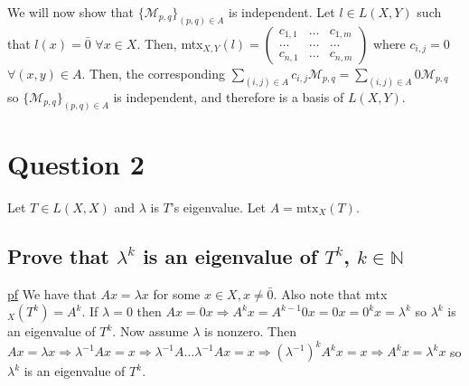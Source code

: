 \documentclass[11pt]{article} %
\begin{document}
We will now show that $\{ \mathcal{M}_{p,q} \}_{(p,q) \in A}$ is independent. Let $l \in L(X,Y)$ such that $l(x) = \bar{0}$ $\forall x \in X.$ Then, mtx$_{X,Y}(l) = \begin{pmatrix}c_{1,1} & \dots  & c_{1,m} \\ \dots & \dots & \dots \\ c_{n,1} & \dots  & c_{n,m} \end{pmatrix}$ where $c_{i,j} = 0$ $\forall (x,y) \in A.$ Then, the corresponding $\sum_{(i,j) \in A} c_{i,j}\mathcal{M}_{p,q} = \sum_{(i,j) \in A} 0 \mathcal{M}_{p,q}$ so $\{ \mathcal{M}_{p,q} \}_{(p,q) \in A}$ is independent, and therefore is a basis of $L(X,Y).$
%
%

\section{Question 2}
Let $T \in L(X,X)$ and $\lambda$ is $T$'s eigenvalue. Let $A = \text{mtx}_X(T)$. 

\subsection{Prove that $\lambda^k$ is an eigenvalue of $T^k$, $k \in \mathbb{N}$}
\underline{pf} We have that $Ax = \lambda x$ for some $x \in X, x \neq \bar{0}$. Also note that mtx$_X(T^k) = A^k.$ If $\lambda = 0$ then $Ax = 0x \Rightarrow A^kx = A^{k-1}0x = 0x = 0^{k}x = \lambda^{k}$ so $\lambda^{k}$ is an eigenvalue of $T^k$. Now assume $\lambda$ is nonzero. Then $Ax = \lambda x \Rightarrow \lambda^{-1} Ax = x \Rightarrow \lambda^{-1}A \dots \lambda^{-1} A x = x \Rightarrow (\lambda^{-1})^k A^k x = x \Rightarrow A^k x = \lambda^k x$ so $\lambda^k$ is an eigenvalue of $T^k$.
\end{document}
